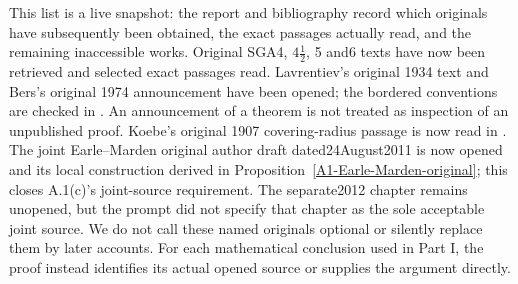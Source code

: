This list is a live snapshot: the report and bibliography record which
originals have subsequently been obtained, the exact passages actually
read, and the remaining inaccessible works. Original SGA4, $4\frac12$,
5 and6 texts have now been retrieved and selected exact passages read.
Lavrentiev's original 1934 text and Bers's original 1974 announcement
have been opened; the bordered conventions are checked in
\cite[\S\S2(F),3(F),4(E)]{ABers1981}. An announcement of a theorem is
not treated as inspection of an unpublished proof. Koebe's original
1907 covering-radius passage is now read in
\cite[pp.~203--205]{AKoebe1907}. The joint Earle--Marden original
author draft dated24August2011 is now opened and its local construction
derived in Proposition~\ref{A1-Earle-Marden-original}; this closes
A.1(c)'s joint-source requirement. The separate2012 chapter remains
unopened, but the prompt did not specify that chapter as the sole
acceptable joint source. We do not call these
named originals optional or silently replace
them by later accounts. For each mathematical conclusion used in Part I,
the proof instead identifies its actual opened source or supplies the
argument directly.
